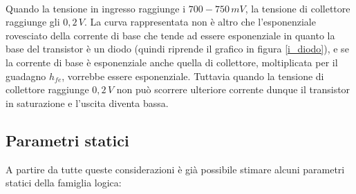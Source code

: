 \documentclass[12pt, a4paper]{report}
\begin{document}
\\Quando la tensione in ingresso raggiunge i $700 - 750\,mV$, la tensione di collettore raggiunge gli $0,2\,V$. La curva rappresentata non è altro che l'esponenziale rovesciato della corrente di base che tende ad essere esponenziale in quanto la base del transistor è un diodo (quindi riprende il grafico in figura \ref{i_diodo}), e se la corrente di base è esponenziale anche quella di collettore, moltiplicata per il guadagno $h_{fe}$, vorrebbe essere esponenziale. Tuttavia quando la tensione di collettore raggiunge $0,2\,V$ non può scorrere ulteriore corrente dunque il transistor in saturazione e l'uscita diventa bassa.

\subsection{Parametri statici}
A partire da tutte queste considerazioni è già possibile stimare alcuni parametri statici della famiglia logica:
\end{document}
